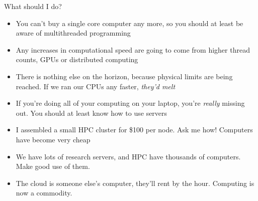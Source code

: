 \documentclass{beamer}
\begin{document}
\begin{frame}{What should I do?}
	\begin{itemize}
\item You can't buy a single core computer any more, so you should at least be aware of multithreaded programming
\item Any increases in computational speed are going to come from higher thread counts, GPUs or distributed computing
\item There is nothing else on the horizon, because physical limits are being reached. If
	we ran our CPUs any faster, \emph{they'd melt} 
\item If you're doing all of your computing on your laptop, you're \emph{really}
	missing out. You should at least know how to use servers
\item I assembled a small HPC cluster for \$100 per node. Ask me how! Computers have become very cheap
\item We have lots of research servers, and HPC have thousands of computers. Make good use of
	them.
\item The cloud is someone else's computer, they'll rent by the hour. Computing is now a commodity.
	\end{itemize}
\end{frame}
\end{document}
